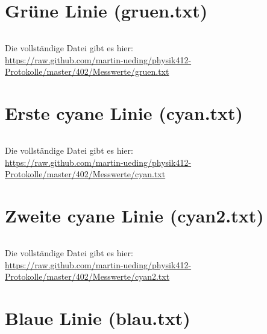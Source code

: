 \begin{appendix}
    \section{Grüne Linie (gruen.txt)}
    \begin{multicols}{5}
        \inputminted[tabsize=4, firstline=<< gruen_lower >>, lastline=<< gruen_upper >>, fontsize=\footnotesize]{text}{../Messwerte/gruen.txt}
    \end{multicols}

    Die vollständige Datei gibt es hier: \\
    \url{https://raw.github.com/martin-ueding/physik412-Protokolle/master/402/Messwerte/gruen.txt}

    \section{Erste cyane Linie (cyan.txt)}
    \begin{multicols}{5}
        \inputminted[tabsize=4, firstline=<< cyan_lower >>, lastline=<< cyan_upper >>, fontsize=\footnotesize]{text}{../Messwerte/cyan.txt}
    \end{multicols}

    Die vollständige Datei gibt es hier: \\
    \url{https://raw.github.com/martin-ueding/physik412-Protokolle/master/402/Messwerte/cyan.txt}

    \section{Zweite cyane Linie (cyan2.txt)}
    \begin{multicols}{5}
        \inputminted[tabsize=4, firstline=<< cyan2_lower >>, lastline=<< cyan2_upper >>, fontsize=\footnotesize]{text}{../Messwerte/cyan2.txt}
    \end{multicols}

    Die vollständige Datei gibt es hier: \\
    \url{https://raw.github.com/martin-ueding/physik412-Protokolle/master/402/Messwerte/cyan2.txt}

    \section{Blaue Linie (blau.txt)}
    \begin{multicols}{5}
        \inputminted[tabsize=4, firstline=<< blau_lower >>, lastline=<< blau_upper >>, fontsize=\footnotesize]{text}{../Messwerte/blau.txt}
    \end{multicols}


\end{appendix}

